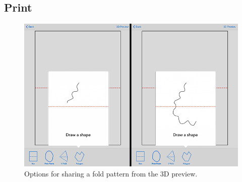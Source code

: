 \subsection{Print}\label{print}

\begin{figure}[htbp]
\centering
\includegraphics{figures/32_UI_Tool_Interactions/tutorial_step_one_two.png}
\caption{Options for sharing a fold pattern from the 3D preview.}
\end{figure}
